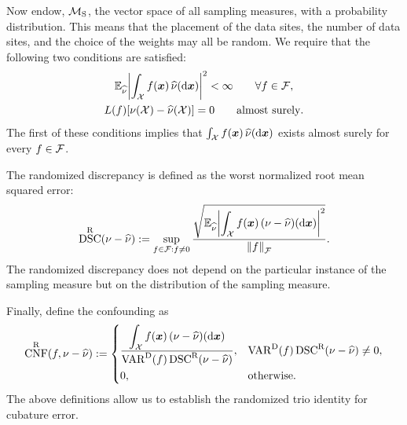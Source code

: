 \documentclass[graybox,footinfo]{svmult}
\DeclareMathOperator{\algn}{CNF}
\DeclareMathOperator{\disc}{DSC}
\DeclareMathOperator{\Var}{VAR}
\begin{document}
Now endow, $\mathcal{M}_{\textup{S}}$, the vector space of all sampling measures, with a 
probability distribution.  This means that the placement of the data sites, the number of 
data sites, and the choice of the weights may all be random.  We require that 
the following two conditions are satisfied:
\begin{subequations} \label{FJH:eq:randMcond}
\begin{gather}
\bbE_{\hnu} \biggabs{\int_{\cx} f(\bsx) \,  \hnu(\D \bsx)}^2 < \infty \qquad \forall f \in \cf, \\
\label{FJH:eq:randMcondB}
L(f) [\nu(\calX) - \hnu(\calX)] = 0  \qquad \text{almost surely}.
\end{gather}
\end{subequations}
The first of these conditions implies that $\int_{\mathcal{X}} f({\boldsymbol{x}}) \,  \widehat{\nu}(\mathrm{d} {\boldsymbol{x}})$ exists 
almost surely for every $f \in \mathcal{F}$.  

The randomized discrepancy is  defined as the worst  normalized root mean squared 
error:
\begin{equation} \label{FJH:eq:rnddiscdef}
\disc^\Rn(\nu - \hnu) : =\sup_{f \in \cf : f \ne 0} \frac{\displaystyle \sqrt{\bbE_{\hnu}
\biggabs{\int_{\cx} 
		f(\bsx) \, (\nu - \hnu)(\D \bsx)}^2}}{\norm{f}_{\cf}}.
\end{equation}
The randomized discrepancy does not depend on the particular instance of the 
sampling measure but on the distribution of the sampling measure. 

Finally, define the confounding as 
\begin{equation} \label{FJH:eq:rndconfdef}
\algn^\Rn(f,\nu - \hnu): =  \begin{cases} \displaystyle 
\frac{\displaystyle\int_{\cx} f(\bsx) \, (\nu - \hnu)(\D 
	\bsx)}{\Var^\Dt(f)\disc^\Rn(\nu - \hnu)},  & 
\Var^\Dt(f)\disc^\Rn(\nu - \hnu) \ne 0, \\[2ex]
0, & \text{otherwise}.
\end{cases}
\end{equation}
The above definitions allow us to establish the randomized trio identity for cubature 
error.
\end{document}
